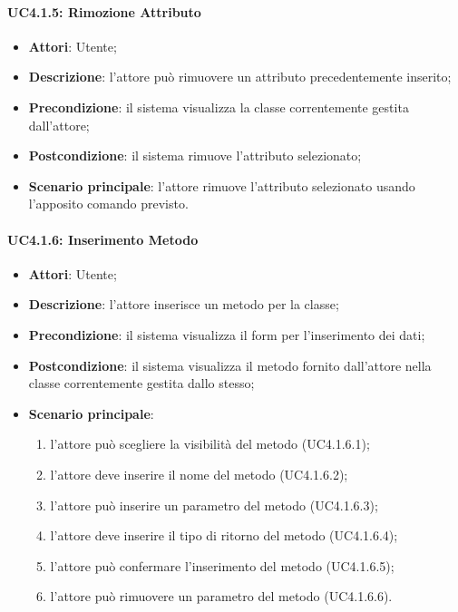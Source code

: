 \paragraph{UC4.1.5: Rimozione Attributo}
\label{UC4.1.5}
\begin{itemize}
\item \textbf{Attori}: Utente;
\item \textbf{Descrizione}: l'attore può rimuovere un attributo precedentemente inserito;
\item \textbf{Precondizione}: il sistema visualizza la classe correntemente gestita dall'attore;
\item \textbf{Postcondizione}: il sistema rimuove l'attributo selezionato;
\item \textbf{Scenario principale}:
l'attore rimuove l'attributo selezionato usando l'apposito comando previsto.
\end{itemize}

\paragraph{UC4.1.6: Inserimento Metodo}
\label{UC4.1.6}
\begin{itemize}
\item \textbf{Attori}: Utente;
\item \textbf{Descrizione}: l'attore inserisce un metodo per la classe;
\item \textbf{Precondizione}: il sistema visualizza il form per l'inserimento dei dati;
\item \textbf{Postcondizione}: il sistema visualizza il metodo fornito dall'attore nella classe correntemente gestita dallo stesso;
\item \textbf{Scenario principale}:
\begin{enumerate}
	\item l'attore può scegliere la visibilità del metodo (UC4.1.6.1);
	\item l'attore deve inserire il nome del metodo (UC4.1.6.2);
	\item l'attore può inserire un parametro del metodo (UC4.1.6.3);
	\item l'attore deve inserire il tipo di ritorno del metodo (UC4.1.6.4);
	\item l'attore può confermare l'inserimento del metodo (UC4.1.6.5);
	\item l'attore può rimuovere un parametro del metodo (UC4.1.6.6).
\end{enumerate}
\end{itemize}

